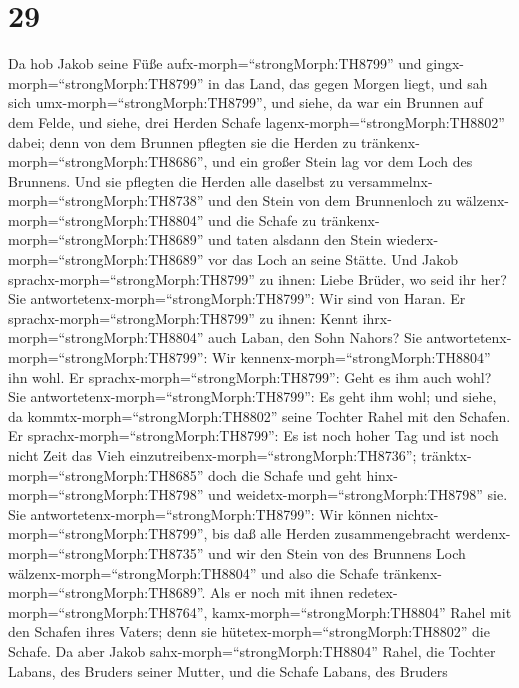 \hypertarget{section-28}{%
\section{29}\label{section-28}}

 Da hob Jakob seine Füße aufx-morph=``strongMorph:TH8799''
und gingx-morph=``strongMorph:TH8799'' in das Land, das gegen Morgen
liegt,  und sah sich umx-morph=``strongMorph:TH8799'', und
siehe, da war ein Brunnen auf dem Felde, und siehe, drei Herden Schafe
lagenx-morph=``strongMorph:TH8802'' dabei; denn von dem Brunnen pflegten
sie die Herden zu tränkenx-morph=``strongMorph:TH8686'', und ein großer
Stein lag vor dem Loch des Brunnens.  Und sie pflegten die
Herden alle daselbst zu versammelnx-morph=``strongMorph:TH8738'' und den
Stein von dem Brunnenloch zu wälzenx-morph=``strongMorph:TH8804'' und
die Schafe zu tränkenx-morph=``strongMorph:TH8689'' und taten alsdann
den Stein wiederx-morph=``strongMorph:TH8689'' vor das Loch an seine
Stätte.  Und Jakob sprachx-morph=``strongMorph:TH8799'' zu
ihnen: Liebe Brüder, wo seid ihr her? Sie
antwortetenx-morph=``strongMorph:TH8799'': Wir sind von Haran.
 Er sprachx-morph=``strongMorph:TH8799'' zu ihnen: Kennt
ihrx-morph=``strongMorph:TH8804'' auch Laban, den Sohn Nahors? Sie
antwortetenx-morph=``strongMorph:TH8799'': Wir
kennenx-morph=``strongMorph:TH8804'' ihn wohl.  Er
sprachx-morph=``strongMorph:TH8799'': Geht es ihm auch wohl? Sie
antwortetenx-morph=``strongMorph:TH8799'': Es geht ihm wohl; und siehe,
da kommtx-morph=``strongMorph:TH8802'' seine Tochter Rahel mit den
Schafen.  Er sprachx-morph=``strongMorph:TH8799'': Es ist
noch hoher Tag und ist noch nicht Zeit das Vieh
einzutreibenx-morph=``strongMorph:TH8736'';
tränktx-morph=``strongMorph:TH8685'' doch die Schafe und geht
hinx-morph=``strongMorph:TH8798'' und
weidetx-morph=``strongMorph:TH8798'' sie.  Sie
antwortetenx-morph=``strongMorph:TH8799'': Wir können
nichtx-morph=``strongMorph:TH8799'', bis daß alle Herden
zusammengebracht werdenx-morph=``strongMorph:TH8735'' und wir den Stein
von des Brunnens Loch wälzenx-morph=``strongMorph:TH8804'' und also die
Schafe tränkenx-morph=``strongMorph:TH8689''.  Als er noch
mit ihnen redetex-morph=``strongMorph:TH8764'',
kamx-morph=``strongMorph:TH8804'' Rahel mit den Schafen ihres Vaters;
denn sie hütetex-morph=``strongMorph:TH8802'' die Schafe. 
Da aber Jakob sahx-morph=``strongMorph:TH8804'' Rahel, die Tochter
Labans, des Bruders seiner Mutter, und die Schafe Labans, des Bruders
